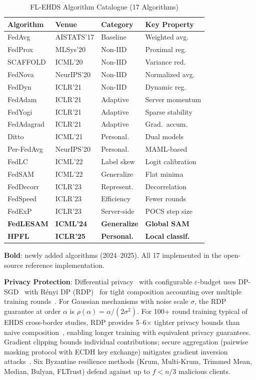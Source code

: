 \documentclass[conference,a4paper]{IEEEtran}
\begin{document}
\begin{table}[htbp]
\centering
\caption{FL-EHDS Algorithm Catalogue (17 Algorithms)}
\label{tab:algo_catalogue}
\small
\begin{tabular}{llll}
\toprule
\textbf{Algorithm} & \textbf{Venue} & \textbf{Category} & \textbf{Key Property} \\
\midrule
FedAvg & AISTATS'17 & Baseline & Weighted avg. \\
FedProx & MLSys'20 & Non-IID & Proximal reg. \\
SCAFFOLD & ICML'20 & Non-IID & Variance red. \\
FedNova & NeurIPS'20 & Non-IID & Normalized avg. \\
FedDyn & ICLR'21 & Non-IID & Dynamic reg. \\
FedAdam & ICLR'21 & Adaptive & Server momentum \\
FedYogi & ICLR'21 & Adaptive & Sparse stability \\
FedAdagrad & ICLR'21 & Adaptive & Grad.\ accum. \\
Ditto & ICML'21 & Personal. & Dual models \\
Per-FedAvg & NeurIPS'20 & Personal. & MAML-based \\
FedLC & ICML'22 & Label skew & Logit calibration \\
FedSAM & ICML'22 & Generalize & Flat minima \\
FedDecorr & ICLR'23 & Represent. & Decorrelation \\
FedSpeed & ICLR'23 & Efficiency & Fewer rounds \\
FedExP & ICLR'23 & Server-side & POCS step size \\
\textbf{FedLESAM} & \textbf{ICML'24} & \textbf{Generalize} & \textbf{Global SAM} \\
\textbf{HPFL} & \textbf{ICLR'25} & \textbf{Personal.} & \textbf{Local classif.} \\
\bottomrule
\end{tabular}

\vspace{1mm}
\footnotesize{\textbf{Bold}: newly added algorithms (2024--2025). All 17 implemented in the open-source reference implementation.}
\end{table}

\textbf{Privacy Protection}: Differential privacy~\cite{dwork2014dp} with configurable $\varepsilon$-budget uses DP-SGD~\cite{abadi2016deep} with R\'enyi DP (RDP)~\cite{mironov2017renyi} for tight composition accounting over multiple training rounds~\cite{wei2020federated}. For Gaussian mechanisms with noise scale $\sigma$, the RDP guarantee at order $\alpha$ is $\rho(\alpha) = \alpha/(2\sigma^2)$. For 100+ round training typical of EHDS cross-border studies, RDP provides 5--6$\times$ tighter privacy bounds than naive composition~\cite{mironov2017renyi, wei2020federated}, enabling longer training with equivalent privacy guarantees. Gradient clipping bounds individual contributions; secure aggregation (pairwise masking protocol with ECDH key exchange) mitigates gradient inversion attacks~\cite{zhu2019deep}. Six Byzantine resilience methods (Krum, Multi-Krum, Trimmed Mean, Median, Bulyan, FLTrust) defend against up to $f < n/3$ malicious clients.
\end{document}
